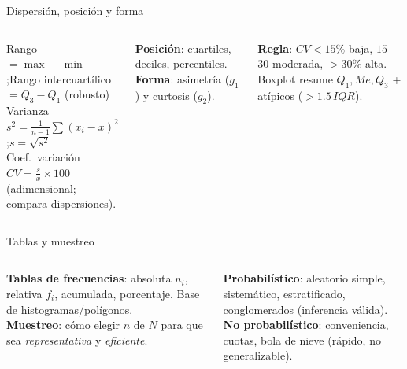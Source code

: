 \documentclass[aspectratio=169,8pt]{beamer}
\begin{document}
\begin{frame}{Dispersi\'on, posici\'on y forma}
  \small
  \begin{columns}[T,onlytextwidth]
      \begin{tcolorbox}[formulabox,title=Diversidad alrededor del centro]
        \footnotesize
        Rango $= \max-\min$;\quad Rango intercuart\'ilico $=Q_3-Q_1$ (robusto)\\[2pt]
        Varianza $s^2=\tfrac1{n-1}\sum(x_i-\bar x)^2$;\quad $s=\sqrt{s^2}$\\[2pt]
        Coef.\ variaci\'on $CV=\tfrac{s}{\bar x}\times100$ (adimensional; compara dispersiones).
      \end{tcolorbox}
      \textbf{Posici\'on}: cuartiles, deciles, percentiles. \textbf{Forma}: asimetr\'ia ($g_1$) y curtosis ($g_2$).
      \begin{tcolorbox}[infobox]
        \scriptsize
        \textbf{Regla}: $CV<15\%$ baja, $15$--$30$ moderada, $>30\%$ alta. Boxplot resume $Q_1,Me,Q_3$ + at\'ipicos ($>1.5\,IQR$).
      \end{tcolorbox}
    \end{columns}
\end{frame}

\begin{frame}{Tablas y muestreo}
  \small
  \begin{columns}[T,onlytextwidth]
      \textbf{Tablas de frecuencias}: absoluta $n_i$, relativa $f_i$, acumulada, porcentaje. Base de histogramas/pol\'igonos.\\[4pt]
      \textbf{Muestreo}: c\'omo elegir $n$ de $N$ para que sea \emph{representativa} y \emph{eficiente}.
      \begin{tcolorbox}[formulabox,title=Probabil\'istico vs.\ no probabil\'istico]
        \scriptsize
        \textbf{Probabil\'istico}: aleatorio simple, sistem\'atico, estratificado, conglomerados (inferencia v\'alida).\\
        \textbf{No probabil\'istico}: conveniencia, cuotas, bola de nieve (r\'apido, no generalizable).
      \end{tcolorbox}
    \end{columns}
\end{frame}
\end{document}
